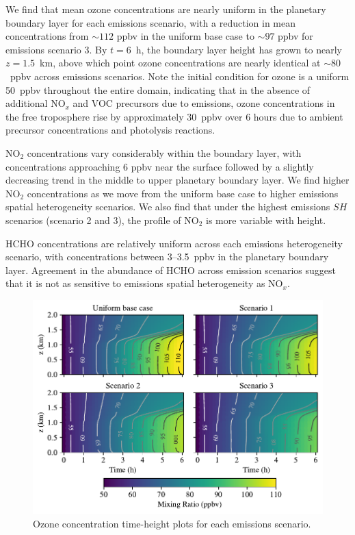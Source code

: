 We find that mean ozone concentrations are nearly uniform in the planetary boundary layer for each emissions scenario, with a reduction in mean concentrations from $\sim 112$ ppbv in the uniform base case to $\sim 97$ ppbv for emissions scenario 3. By $t=6$~h, the boundary layer height has grown to nearly $z=1.5$~\si{km}, above which point ozone concentrations are nearly identical at $\sim80$~\si{ppbv} across emissions scenarios. Note the initial condition for ozone is a uniform 50~\si{ppbv} throughout the entire domain, indicating that in the absence of additional NO$_x$ and VOC precursors due to emissions, ozone concentrations in the free troposphere rise by approximately 30~\si{ppbv} over 6 hours due to ambient precursor concentrations and photolysis reactions.

NO$_2$ concentrations vary considerably within the boundary layer, with concentrations approaching 6 ppbv near the surface followed by a slightly decreasing trend in the middle to upper planetary boundary layer. We find higher NO$_2$ concentrations as we move from the uniform base case to higher emissions spatial heterogeneity scenarios. We also find that under the highest emissions $SH$ scenarios (scenario 2 and 3), the profile of NO$_2$ is more variable with height.

HCHO concentrations are relatively uniform across each emissions heterogeneity scenario, with concentrations between 3--3.5~\si{ppbv} in the planetary boundary layer. Agreement in the abundance of HCHO across emission scenarios suggest that it is not as sensitive to emissions spatial heterogeneity as NO$_x$. 

\begin{figure}[t]
  \centering
    \includegraphics[width=\textwidth]{figures/chapter4/height-time-o3-four-scenarios.pdf}
    \caption{Ozone concentration time-height plots for each emissions scenario.}
    \label{fig:ht-o3}
\end{figure}

